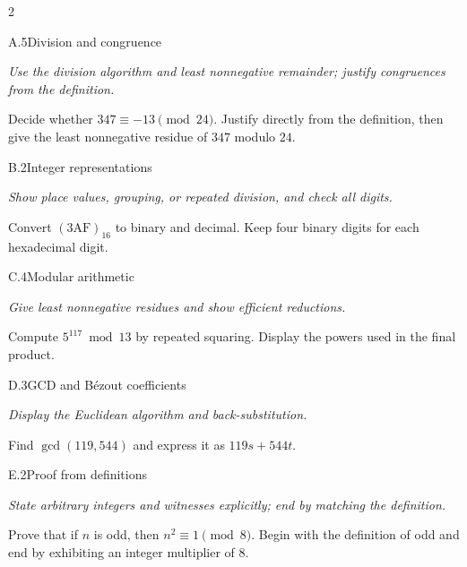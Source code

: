 \documentclass[9pt]{extarticle}
\begin{document}
\begin{multicols}{2}
\begin{CoreProblem}{A.5}{Division and congruence}
{\scriptsize\textit{Use the division algorithm and least nonnegative remainder; justify congruences from the definition.}\par}
Decide whether $347\equiv-13\pmod{24}$. Justify directly from the definition,
then give the least nonnegative residue of $347$ modulo $24$.
\end{CoreProblem}
\begin{CoreProblem}{B.2}{Integer representations}
{\scriptsize\textit{Show place values, grouping, or repeated division, and check all digits.}\par}
Convert $(\mathrm{3AF})_{16}$ to binary and decimal. Keep four binary digits
for each hexadecimal digit.
\end{CoreProblem}
\begin{CoreProblem}{C.4}{Modular arithmetic}
{\scriptsize\textit{Give least nonnegative residues and show efficient reductions.}\par}
Compute $5^{117}\bmod13$ by repeated squaring. Display the powers used in the
final product.
\end{CoreProblem}
\columnbreak
\begin{CoreProblem}{D.3}{GCD and B\'ezout coefficients}
{\scriptsize\textit{Display the Euclidean algorithm and back-substitution.}\par}
Find $\gcd(119,544)$ and express it as $119s+544t$.
\end{CoreProblem}
\begin{CoreProblem}{E.2}{Proof from definitions}
{\scriptsize\textit{State arbitrary integers and witnesses explicitly; end by matching the definition.}\par}
Prove that if $n$ is odd, then $n^2\equiv1\pmod{8}$. Begin with the definition
of odd and end by exhibiting an integer multiplier of $8$.
\end{CoreProblem}
\end{multicols}
\CoreWorkArea
\FormBreak
{}
\end{document}
